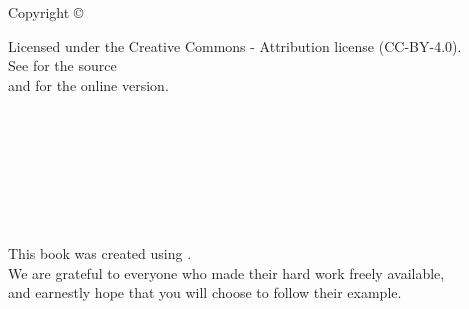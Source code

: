 \documentclass[10pt,statementpaper]{memoir}
\begin{document}
\pagestyle{empty}

{\begingroup
  \raggedleft
  \vspace*{\baselineskip}

{\Huge\itshape \sitetitle{}}\\[\baselineskip]

{\large\itshape
  \sitesubtitle{}
}\\[0.2\textheight]

{\large \siteauthor{}}\par

\vfill

{\large Copyright {\copyright} \siteyear{}}

\vspace*{\baselineskip}


\vspace*{\baselineskip}

{\small
  \begin{flushright}
  Licensed under the Creative Commons - Attribution license (CC-BY-4.0).
  \\
  See \siterepo{} for the source
  \\
  and \siteurl{} for the online version.
  \end{flushright}
}

\endgroup}



\newpage
\pagestyle{empty}

~

\newpage
{}
\tableofcontents

\newpage
\pagestyle{empty}

~

\newpage
\listoffigures

\newpage
\pagestyle{empty}

~

\newpage
\listoftables

\newpage
\pagestyle{empty}

~

\newpage
\pagestyle{plain}



\cleartoverso
{\begingroup
  \raggedleft
  \vspace*{4\baselineskip}
  This book was created using \sitetools{}. \\
  We are grateful to everyone who made their hard work freely available, \\
  and earnestly hope that you will choose to follow their example.

\endgroup}
\end{document}
